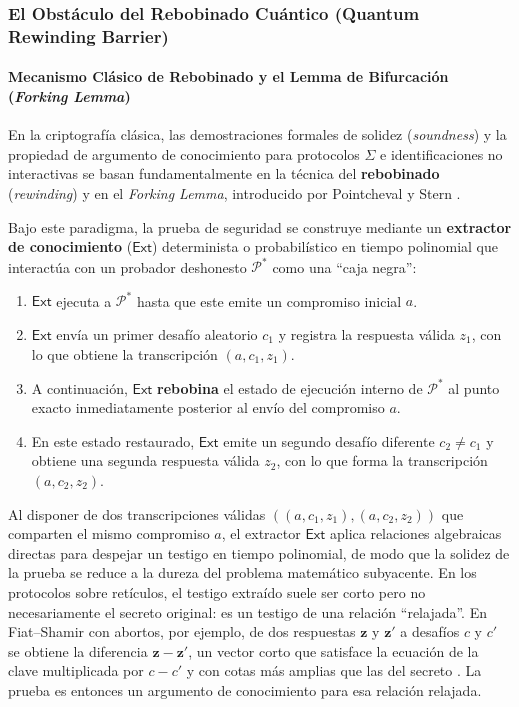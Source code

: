 \subsubsection{El Obstáculo del Rebobinado Cuántico (Quantum Rewinding Barrier)}
\label{sec:rebobinado}

\paragraph{Mecanismo Clásico de Rebobinado y el Lemma de Bifurcación (\textit{Forking Lemma})}
En la criptografía clásica, las demostraciones formales de solidez (\textit{soundness}) y la propiedad de argumento de conocimiento para protocolos $\Sigma$ e identificaciones no interactivas se basan fundamentalmente en la técnica del \textbf{rebobinado} (\textit{rewinding}) y en el \textit{Forking Lemma}, introducido por Pointcheval y Stern \cite{pointcheval2000security}.

Bajo este paradigma, la prueba de seguridad se construye mediante un \textbf{extractor de conocimiento} ($\mathsf{Ext}$) determinista o probabilístico en tiempo polinomial que interactúa con un probador deshonesto $\mathcal{P}^*$ como una ``caja negra'':
\begin{enumerate}
    \item $\mathsf{Ext}$ ejecuta a $\mathcal{P}^*$ hasta que este emite un compromiso inicial $a$.
    \item $\mathsf{Ext}$ envía un primer desafío aleatorio $c_1$ y registra la respuesta válida $z_1$, con lo que obtiene la transcripción $(a, c_1, z_1)$.
    \item A continuación, $\mathsf{Ext}$ \textbf{rebobina} el estado de ejecución interno de $\mathcal{P}^*$ al punto exacto inmediatamente posterior al envío del compromiso $a$.
    \item En este estado restaurado, $\mathsf{Ext}$ emite un segundo desafío diferente $c_2 \neq c_1$ y obtiene una segunda respuesta válida $z_2$, con lo que forma la transcripción $(a, c_2, z_2)$.
\end{enumerate}

Al disponer de dos transcripciones válidas $((a, c_1, z_1), (a, c_2, z_2))$ que comparten el mismo compromiso $a$, el extractor $\mathsf{Ext}$ aplica relaciones algebraicas directas para despejar un testigo en tiempo polinomial, de modo que la solidez de la prueba se reduce a la dureza del problema matemático subyacente. En los protocolos sobre retículos, el testigo extraído suele ser corto pero no necesariamente el secreto original: es un testigo de una relación ``relajada''. En Fiat--Shamir con abortos, por ejemplo, de dos respuestas $\mathbf{z}$ y $\mathbf{z}'$ a desafíos $c$ y $c'$ se obtiene la diferencia $\mathbf{z} - \mathbf{z}'$, un vector corto que satisface la ecuación de la clave multiplicada por $c - c'$ y con cotas más amplias que las del secreto \cite{lyubashevsky2012lattice}. La prueba es entonces un argumento de conocimiento para esa relación relajada.

